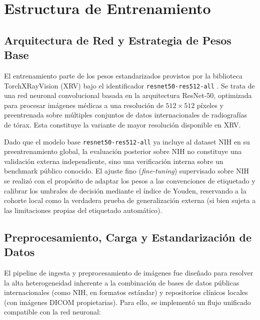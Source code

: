 \documentclass[../main.tex]{subfiles}
\begin{document}
\section{Estructura de Entrenamiento}

\subsection{Arquitectura de Red y Estrategia de Pesos Base}
El entrenamiento parte de los pesos estandarizados provistos por la biblioteca TorchXRayVision (XRV) bajo el identificador \texttt{resnet50-res512-all} \citep{Cohen2020xrv}. Se trata de una red neuronal convolucional basada en la arquitectura ResNet-50, optimizada para procesar imágenes médicas a una resolución de $512 \times 512$ píxeles y preentrenada sobre múltiples conjuntos de datos internacionales de radiografías de tórax. Esta constituye la variante de mayor resolución disponible en XRV.

Dado que el modelo base \texttt{resnet50-res512-all} ya incluye al dataset NIH en su preentrenamiento global, la evaluación posterior sobre NIH no constituye una validación externa independiente, sino una verificación interna sobre un benchmark público conocido. El ajuste fino (\textit{fine-tuning}) supervisado sobre NIH se realizó con el propósito de adaptar los pesos a las convenciones de etiquetado y calibrar los umbrales de decisión mediante el índice de Youden, reservando a la cohorte local como la verdadera prueba de generalización externa (si bien sujeta a las limitaciones propias del etiquetado automático).

\subsection{Preprocesamiento, Carga y Estandarización de Datos}
\label{sec:Preprocesamiento, Carga y Estandarización de Datos}
El pipeline de ingesta y preprocesamiento de imágenes fue diseñado para resolver la alta heterogeneidad inherente a la combinación de bases de datos públicas internacionales (como NIH, en formatos estándar) y repositorios clínicos locales (con imágenes DICOM propietarias). Para ello, se implementó un flujo unificado compatible con la red neuronal:
\end{document}
